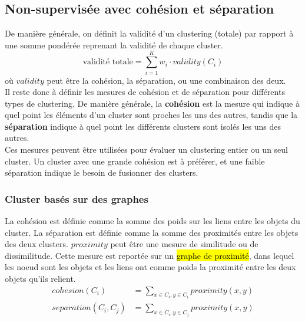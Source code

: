 \documentclass[letterpaper, 12pt]{article}
\newcommand{\alinea}{
\hspace*{0.5cm}}
\begin{document}
		\subsection{Non-supervisée avec cohésion et séparation}
			\alinea De manière générale, on définit la validité d'un 
				clustering (totale) par rapport à une somme pondérée
				reprenant la validité de chaque cluster.
				$$ \text{validité totale} = \sum_{i=1}^{K} w_i\cdot
						 					   validity(C_i) $$
				où $validity$ peut être la cohésion, la séparation, 
				ou une combinaison des deux.\\ 
				Il reste donc à définir les mesures de cohésion et de
				séparation pour différents types de clustering.
				De manière générale, la \textbf{cohésion} est la
				mesure qui indique à quel point les éléments d'un
				cluster sont proches les uns des autres, tandis que
				la \textbf{séparation} indique à quel point
				les différents clusters sont isolés les uns des autres.\\
			\alinea Ces mesures peuvent être utilisées pour évaluer
				un clustering entier ou un seul cluster. Un cluster
				avec une grande cohésion est à préférer, et une faible
				séparation indique le besoin de fusionner des clusters.
			\subsubsection{Cluster basés sur des graphes}
				\alinea La cohésion est définie comme la somme des poids
					sur les liens entre les objets du cluster. La 
					séparation est définie comme la somme des proximités
					entre les objets des deux clusters. $proximity$ peut
					être une mesure de similitude ou de dissimilitude. 
					Cette mesure est reportée sur un \hl{graphe de proximité},
					dans lequel les noeud sont les objets et les liens
					ont comme poids la proximité entre les deux objets  
					qu'ils relient.
					\begin{align*}
						cohesion(C_i) &= \sum_{x\in C_i, y\in C_i}
								proximity(x, y)\\
						separation(C_i, C_j) &= \sum_{x\in C_i, y\in C_j}
								proximity(x, y)
					\end{align*}
\end{document}
